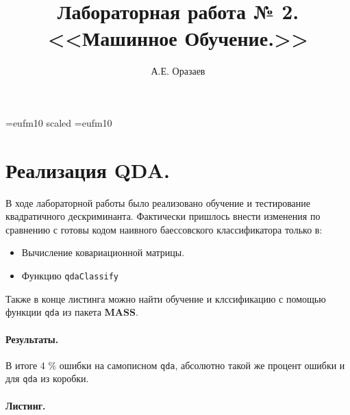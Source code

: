 \documentclass[12pt]{article}
\title{\bf Лабораторная работа № 2. \\ <<Машинное
Обучение.>>}
\author{А.Е. Оразаев}
\date{}
\begin{document}
\voffset=-20mm
\hoffset=-12mm
\font\Got=eufm10 scaled \font\Got=eufm10

\maketitle

\section{Реализация QDA.}
В ходе лабораторной работы было реализовано обучение и тестирование
квадратичного дескриминанта. Фактически пришлось внести изменения по
сравнению с готовы кодом наивного баессовского классификатора только в:
\begin{itemize}
    \item Вычисление ковариационной матрицы.
    \item Функцию \verb=qdaClassify=
\end{itemize}

Также в конце листинга можно найти обучение и клссификацию с помощью
функции \verb=qda= из пакета \textbf{MASS}.

\paragraph{Результаты.}
В итоге 4 \% ошибки на самописном \verb=qda=, абсолютно такой же
процент ошибки и для \verb=qda= из коробки.


\paragraph{Листинг.}
\begingroup
    \fontsize{10pt}{12pt}\selectfont
    
\endgroup
\end{document}
